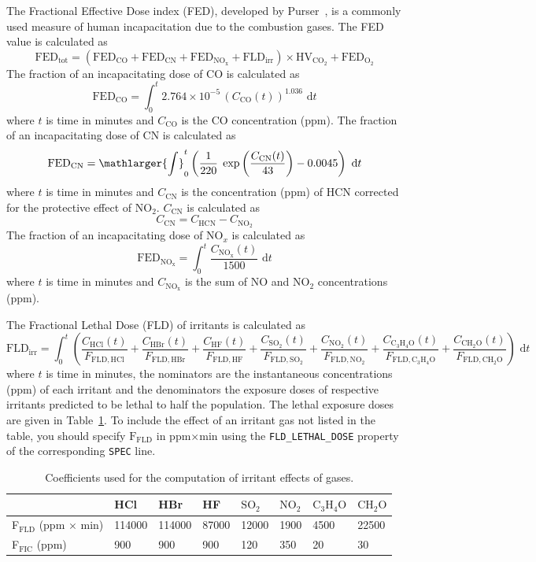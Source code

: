\documentclass[11pt]{book}
\newcommand{\ct}{\tt\small}
\renewcommand{\d}{\,\mathrm{d}}
\newcommand{\be}{\begin{equation}}
\newcommand{\ee}{\end{equation}}
\begin{document}
The Fractional Effective Dose index (FED), developed by Purser~\cite{SFPE:Purser}, is a commonly used measure of human incapacitation
due to the combustion gases. The FED value is calculated as
\be
\mathrm{FED}_\mathrm{tot} = (\mathrm{FED}_\mathrm{CO} + \mathrm{FED}_\mathrm{CN} + \mathrm{FED}_\mathrm{NO_x} + \mathrm{FLD}_\mathrm{irr}) \times \mathrm{HV}_\mathrm{CO_2} + \mathrm{FED}_\mathrm{O_2}
\ee
The fraction of an incapacitating dose of CO is calculated as
\be
\mathrm{FED}_\mathrm{CO} = \int_0^t 2.764 \times 10^{-5} \, (C_\mathrm{CO}(t))^{1.036} \, \d t
\ee
where $t$ is time in minutes and $C_\mathrm{CO}$ is the CO concentration (ppm). The fraction of an incapacitating dose of CN is calculated as
\be
\mathrm{FED}_\mathrm{CN} = \mathlarger{\int}_0^t \left( \frac{1}{220} \; \exp \left( \frac{C_\mathrm{CN}(t)}{43} \right) - 0.0045 \right) \, \d t
\ee
where $t$ is time in minutes and $C_\mathrm{CN}$ is the concentration (ppm) of HCN corrected for the protective effect of NO$_\mathrm{2}$. $C_\mathrm{CN}$ is calculated as
\be
C_\mathrm{CN} = C_\mathrm{HCN} - C_\mathrm{NO_2}
\ee
The fraction of an incapacitating dose of NO$_x$ is calculated as
\be
\mathrm{FED}_\mathrm{NO_x} = \int_0^t \frac{C_\mathrm{NO_x}(t)}{1500} \, \d t
\ee
where $t$ is time in minutes and $C_\mathrm{NO_x}$ is the sum of NO and NO$_\mathrm{2}$ concentrations (ppm).

The Fractional Lethal Dose (FLD) of irritants is calculated as
\be
\mathrm{FLD}_\mathrm{irr} = \int_0^t \left(
    \frac{C_\mathrm{HCl}(t)}    {F_\mathrm{FLD,HCl}} +
    \frac{C_\mathrm{HBr}(t)}    {F_\mathrm{FLD,HBr}} +
    \frac{C_\mathrm{HF}(t)}     {F_\mathrm{FLD,HF}} +
    \frac{C_\mathrm{SO_2}(t)}   {F_\mathrm{FLD,SO_2}} +
    \frac{C_\mathrm{NO_2}(t)}   {F_\mathrm{FLD,NO_2}} +
    \frac{C_\mathrm{C_3H_4O}(t)}{F_\mathrm{FLD,C_3H_4O}} +
    \frac{C_\mathrm{CH_2O}(t)}  {F_\mathrm{FLD,CH_2O}}
    \right) \, \d t
\ee
where $t$ is time in minutes, the nominators are the instantaneous concentrations (ppm) of each irritant and
the denominators the exposure doses of respective irritants predicted to be lethal to half the population.
The lethal exposure doses~\cite{SFPE:Purser} are given in Table~\ref{tbl:FIC}. To include the effect of an irritant gas not listed in the table,
you should specify $\mathrm{F_{FLD}}$ in ppm$\times$min using the {\ct FLD\_LETHAL\_DOSE} property of the corresponding {\ct SPEC} line.
\begin{table}[ht]
\caption[Coefficients used for the computation of irritant effects of gases]{Coefficients used for the computation of irritant effects of gases.}
\label{tbl:FIC}
\begin{center}
\begin{tabular}{|l|l|l|l|l|l|l|l|}
\hline & HCl & HBr & HF & $\mathrm{SO_2}$ & $\mathrm{NO_2}$ & $\mathrm{C_3H_4O}$ & $\mathrm{CH_2O}$  \\ \hline \hline
F${}_\mathrm{FLD}$ (ppm $\times$ min) & 114000 & 114000 & 87000 & 12000 & 1900 & 4500 & 22500 \\
F${}_\mathrm{FIC}$ (ppm) & 900 & 900 & 900 & 120 & 350 & 20 & 30 \\ \hline
\end{tabular}
\end{center}
\end{table}
\end{document}
